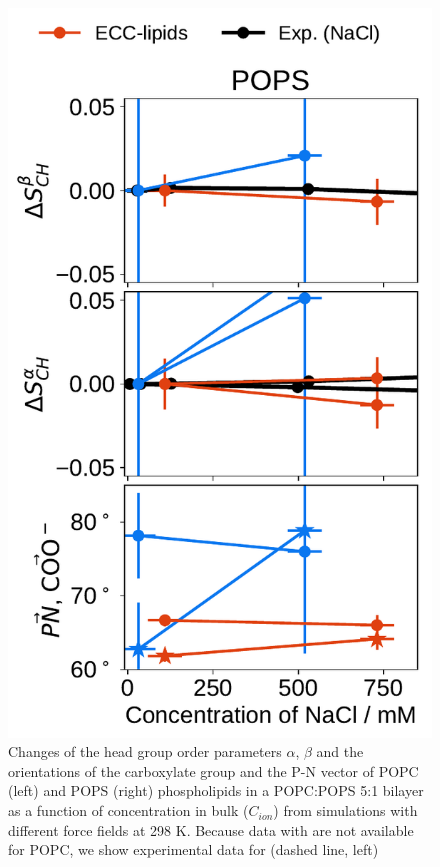 \documentclass[journal=jpcbfk,manuscript=article]{achemso}
\newlength{\figwidth}
\newlength{\figwidthsmall}
\begin{document}
\begin{figure}[tbp!]
  \includegraphics[width=\figwidthsmall]{../img/ecc_pops/order_parameters_changes_ecc-lip_L14_A-B-PN-COO_POPS_nacl.pdf} 
  \caption{\label{fig:delta_ordPar_NaCl_PCPS} 
    Changes of the head group order parameters $\alpha$, $\beta$ and the orientations of the carboxylate group and the P-N vector  
    of POPC (left) and POPS (right) phospholipids in a POPC:POPS 5:1 bilayer as a function of  concentration 
    in bulk ($C_{ion}$) from simulations with different force fields at 298 K.
    Because data with  are not available for POPC, 
    we show experimental data for  (dashed line, left) 
}
\end{figure}
\end{document}
